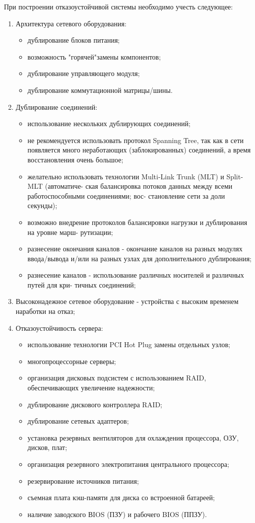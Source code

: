 \documentclass[russian,utf8,emptystyle]{eskdtext}
\begin{document}
При построении отказоустойчивой системы необходимо учесть следующее:
\begin{enumerate}[label=\arabic*.]
\item Архитектура сетевого оборудования:
\begin{itemize}[label=-]
\item дублирование блоков питания;
\item возможность "горячей"замены компонентов;
\item дублирование управляющего модуля;
\item дублирование коммутационной матрицы/шины.
\end{itemize}

\item Дублирование соединений:
\begin{itemize}[label=-]
\item использование нескольких дублирующих соединений;
\item не рекомендуется использовать протокол Spanning Tree, так как в сети появляется много
неработающих (заблокированных) соединений, а время восстановления очень большое;
\item желательно использовать технологии Multi-Link Trunk (MLT) и Split-MLT (автоматиче-
ская балансировка потоков данных между всеми работоспособными соединениями; вос-
становление сети за доли секунды);
\item возможно внедрение протоколов балансировки нагрузки и дублирования на уровне марш-
рутизации;
\item разнесение окончания каналов - окончание каналов на разных модулях ввода/вывода
и/или на разных узлах для дополнительного дублирования;
\item разнесение каналов - использование различных носителей и различных путей для кри-
тичных соединений;
\end{itemize}

\item Высоконадежное сетевое оборудование - устройства с высоким временем наработки на отказ;
\item Отказоустойчивость сервера:
\begin{itemize}[label=-]
\item использование технологии PCI Hot Plug замены отдельных узлов;
\item многопроцессорные серверы;
\item организация дисковых подсистем с использованием RAID, обеспечивающих увеличение
надежности;
\item дублирование дискового контроллера RAID;
\item дублирование сетевых адаптеров;
\item установка резервных вентиляторов для охлаждения процессора, ОЗУ, дисков, плат;
\item организация резервного электропитания центрального процессора;
\item резервирование источников питания;
\item съемная плата кэш-памяти для диска со встроенной батареей;
\item наличие заводского ВIOS (ПЗУ) и рабочего BIOS (ППЗУ).
\end{itemize}


\end{enumerate}
\end{document}
